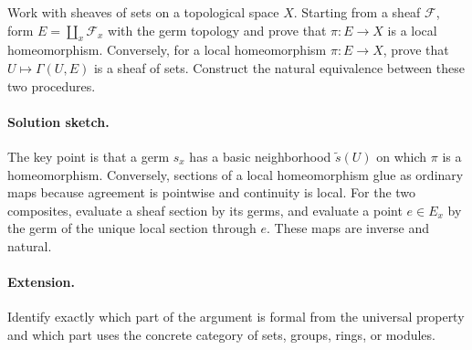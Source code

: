 \begin{problem}
Work with sheaves of sets on a topological space $X$. Starting from a sheaf $\mathcal F$, form $E=\coprod_x\mathcal F_x$ with the germ topology and prove that $\pi:E\to X$ is a local homeomorphism. Conversely, for a local homeomorphism $\pi:E\to X$, prove that $U\mapsto\Gamma(U,E)$ is a sheaf of sets. Construct the natural equivalence between these two procedures.
\end{problem}
\ifdefined\FullProblemDossiers
\paragraph{Solution sketch.}
The key point is that a germ $s_x$ has a basic neighborhood $\widetilde s(U)$ on which $\pi$ is a homeomorphism. Conversely, sections of a local homeomorphism glue as ordinary maps because agreement is pointwise and continuity is local. For the two composites, evaluate a sheaf section by its germs, and evaluate a point $e\in E_x$ by the germ of the unique local section through $e$. These maps are inverse and natural.
\paragraph{Extension.}
Identify exactly which part of the argument is formal from the universal property and which part uses the concrete category of sets, groups, rings, or modules.
\fi
